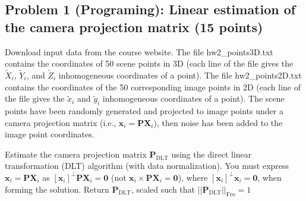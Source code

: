 \documentclass[11pt]{article}
\begin{document}
    \hypertarget{problem-1-programing-linear-estimation-of-the-camera-projection-matrix-15-points}{%
\subsection{Problem 1 (Programing): Linear estimation of the camera
projection matrix (15
points)}\label{problem-1-programing-linear-estimation-of-the-camera-projection-matrix-15-points}}

Download input data from the course website. The file hw2\_points3D.txt
contains the coordinates of 50 scene points in 3D (each line of the file
gives the \(\tilde{X}_i\), \(\tilde{Y}_i\), and \(\tilde{Z}_i\)
inhomogeneous coordinates of a point). The file hw2\_points2D.txt
contains the coordinates of the 50 corresponding image points in 2D
(each line of the file gives the \(\tilde{x}_i\) and \(\tilde{y}_i\)
inhomogeneous coordinates of a point). The scene points have been
randomly generated and projected to image points under a camera
projection matrix (i.e.,
\(\boldsymbol{x}_i  = \boldsymbol{P} \boldsymbol{X}_i\)), then noise has
been added to the image point coordinates.

Estimate the camera projection matrix \(\boldsymbol{P}_\text{DLT}\)
using the direct linear transformation (DLT) algorithm (with data
normalization). You must express
\(\boldsymbol{x}_i = \boldsymbol{P} \boldsymbol{X}_i\) as
\([\boldsymbol{x}_i]^\perp \boldsymbol{P} \boldsymbol{X}_i = \boldsymbol{0}\)
(not
\(\boldsymbol{x}_i \times \boldsymbol{P} \boldsymbol{X}_i = \boldsymbol{0}\)),
where \([\boldsymbol{x}_i]^\perp \boldsymbol{x}_i = \boldsymbol{0}\),
when forming the solution. Return \(\boldsymbol{P}_\text{DLT}\), scaled
such that \(||\boldsymbol{P}_\text{DLT}||_\text{Fro} = 1\)
\end{document}
